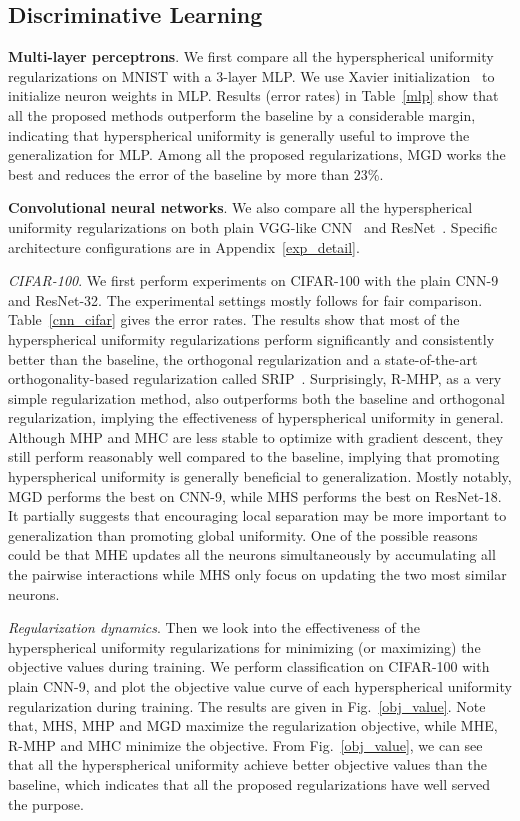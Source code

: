 \subsection{Discriminative Learning}

\textbf{Multi-layer perceptrons}. We first compare all the hyperspherical uniformity regularizations on MNIST with a 3-layer MLP. We use Xavier initialization~\cite{glorot2010understanding} to initialize neuron weights in MLP. Results (error rates) in Table~\ref{mlp} show that all the proposed methods outperform the baseline by a considerable margin, indicating that hyperspherical uniformity is generally useful to improve the generalization for MLP. Among all the proposed regularizations, MGD works the best and reduces the error of the baseline by more than 23\%.

\textbf{Convolutional neural networks}. We also compare all the hyperspherical uniformity regularizations on both plain VGG-like CNN~\cite{simonyan2014very} and ResNet~\cite{he2016deep}. Specific architecture configurations are in Appendix~\ref{exp_detail}.

\emph{CIFAR-100}. We first perform experiments on CIFAR-100 with the plain CNN-9 and ResNet-32. The experimental settings mostly follows \cite{liu2018learning} for fair comparison. Table~\ref{cnn_cifar} gives the error rates. The results show that most of the hyperspherical uniformity regularizations perform significantly and consistently better than the baseline, the orthogonal regularization and a state-of-the-art orthogonality-based regularization called SRIP~\cite{bansal2018can}. Surprisingly, R-MHP, as a very simple regularization method, also outperforms both the baseline and orthogonal regularization, implying the effectiveness of hyperspherical uniformity in general. Although MHP and MHC are less stable to optimize with gradient descent, they still perform reasonably well compared to the baseline, implying that promoting hyperspherical uniformity is generally beneficial to generalization. Mostly notably, MGD performs the best on CNN-9, while MHS performs the best on ResNet-18. It partially suggests that encouraging local separation may be more important to generalization than promoting global uniformity. One of the possible reasons could be that MHE updates all the neurons simultaneously by accumulating all the pairwise interactions while MHS only focus on updating the two most similar neurons.

\emph{Regularization dynamics}. Then we look into the effectiveness of the hyperspherical uniformity regularizations for minimizing (or maximizing) the objective values during training. We perform classification on CIFAR-100 with plain CNN-9, and plot the objective value curve of each hyperspherical uniformity regularization during training. The results are given in Fig.~\ref{obj_value}. Note that, MHS, MHP and MGD maximize the regularization objective, while MHE, R-MHP and MHC minimize the objective. From Fig.~\ref{obj_value}, we can see that all the hyperspherical uniformity achieve better objective values than the baseline, which indicates that all the proposed regularizations have well served the purpose. 

